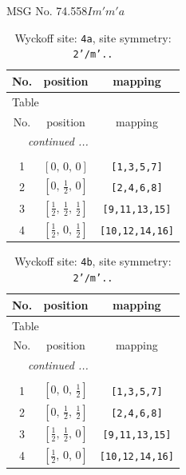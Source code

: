 \documentclass[fleqn,8pt]{jsarticle}
\begin{document}
\setcounter{MaxMatrixCols}{32}

\renewcommand{\tablename}{Table~}
\renewcommand{\figurename}{Figure~}
\begin{center}
\LARGE
MSG No. 74.558\quad$Im'm'a$
\end{center}
\renewcommand{\arraystretch}{1.2}
\begin{longtable}{ccc}
\caption{Wyckoff site: {\tt 4a}, site symmetry: {\tt 2'/m'..}}
 \\
 \hline \hline
No. & position & mapping \\ \hline \endfirsthead

\multicolumn{2}{l}{\tablename\ \thetable{}} \\
 \hline \hline
No. & position & mapping \\ \hline \endhead

 \hline \hline
\multicolumn{2}{r}{\footnotesize\it continued ...} \\ \endfoot

 \hline \hline
\multicolumn{2}{r}{} \\ \endlastfoot

1 & $\left[ 0,\, 0,\, 0 \right]$ & {\tt [1,3,5,7]} \\ \hline
2 & $\left[ 0,\, \frac{1}{2},\, 0 \right]$ & {\tt [2,4,6,8]} \\ \hline
3 & $\left[ \frac{1}{2},\, \frac{1}{2},\, \frac{1}{2} \right]$ & {\tt [9,11,13,15]} \\ \hline
4 & $\left[ \frac{1}{2},\, 0,\, \frac{1}{2} \right]$ & {\tt [10,12,14,16]} \\
\end{longtable}
\renewcommand{\arraystretch}{1.2}
\begin{longtable}{ccc}
\caption{Wyckoff site: {\tt 4b}, site symmetry: {\tt 2'/m'..}}
 \\
 \hline \hline
No. & position & mapping \\ \hline \endfirsthead

\multicolumn{2}{l}{\tablename\ \thetable{}} \\
 \hline \hline
No. & position & mapping \\ \hline \endhead

 \hline \hline
\multicolumn{2}{r}{\footnotesize\it continued ...} \\ \endfoot

 \hline \hline
\multicolumn{2}{r}{} \\ \endlastfoot

1 & $\left[ 0,\, 0,\, \frac{1}{2} \right]$ & {\tt [1,3,5,7]} \\ \hline
2 & $\left[ 0,\, \frac{1}{2},\, \frac{1}{2} \right]$ & {\tt [2,4,6,8]} \\ \hline
3 & $\left[ \frac{1}{2},\, \frac{1}{2},\, 0 \right]$ & {\tt [9,11,13,15]} \\ \hline
4 & $\left[ \frac{1}{2},\, 0,\, 0 \right]$ & {\tt [10,12,14,16]} \\
\end{longtable}
\end{document}
